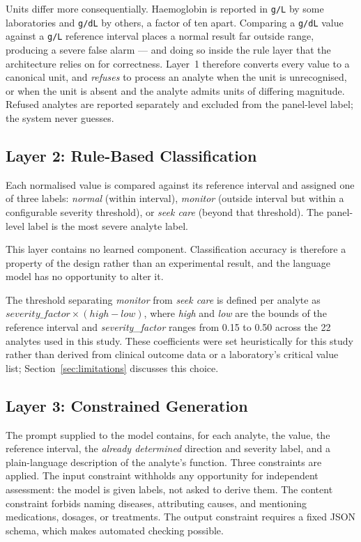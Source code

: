 \documentclass{svproc}
\begin{document}
Units differ more consequentially. Haemoglobin is reported in
\texttt{g/L} by some laboratories and \texttt{g/dL} by others, a factor of
ten apart. Comparing a \texttt{g/dL} value against a \texttt{g/L}
reference interval places a normal result far outside range, producing a
severe false alarm --- and doing so inside the rule layer that the
architecture relies on for correctness. Layer~1 therefore converts every
value to a canonical unit, and \emph{refuses} to process an analyte when
the unit is unrecognised, or when the unit is absent and the analyte
admits units of differing magnitude. Refused analytes are reported
separately and excluded from the panel-level label; the system never
guesses.

\subsection{Layer 2: Rule-Based Classification}

Each normalised value is compared against its reference interval and
assigned one of three labels: \emph{normal} (within interval),
\emph{monitor} (outside interval but within a configurable severity
threshold), or \emph{seek care} (beyond that threshold). The panel-level
label is the most severe analyte label.

This layer contains no learned component. Classification accuracy is
therefore a property of the design rather than an experimental result, and
the language model has no opportunity to alter it.

The threshold separating \emph{monitor} from \emph{seek care} is defined
per analyte as $\mathit{severity\_factor} \times (\mathit{high} -
\mathit{low})$, where \emph{high} and \emph{low} are the bounds of the
reference interval and \emph{severity\_factor} ranges from 0.15 to 0.50
across the 22 analytes used in this study. These coefficients were set
heuristically for this study rather than derived from clinical outcome
data or a laboratory's critical value list; Section~\ref{sec:limitations}
discusses this choice.

\subsection{Layer 3: Constrained Generation}

The prompt supplied to the model contains, for each analyte, the value,
the reference interval, the \emph{already determined} direction and
severity label, and a plain-language description of the analyte's
function. Three constraints are applied. The input constraint withholds
any opportunity for independent assessment: the model is given labels, not
asked to derive them. The content constraint forbids naming diseases,
attributing causes, and mentioning medications, dosages, or treatments.
The output constraint requires a fixed JSON schema, which makes automated
checking possible.
\end{document}
